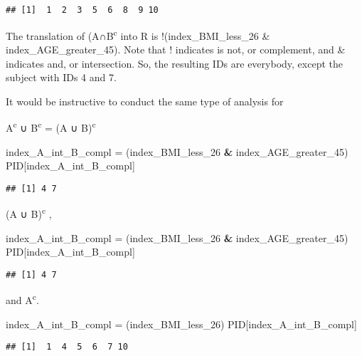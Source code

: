 \documentclass[]{article}
\newenvironment{Shaded}{\begin{snugshade}}{\end{snugshade}}
\newcommand{\DecValTok}[1]{\textcolor[rgb]{0.00,0.00,0.81}{#1}}
\newcommand{\NormalTok}[1]{#1}
\newcommand{\OperatorTok}[1]{\textcolor[rgb]{0.81,0.36,0.00}{\textbf{#1}}}
\newcommand{\StringTok}[1]{\textcolor[rgb]{0.31,0.60,0.02}{#1}}
\begin{document}
\begin{verbatim}
## [1]  1  2  3  5  6  8  9 10
\end{verbatim}

The translation of (A∩B\textsuperscript{c} into R is
!(index\_BMI\_less\_26 \& index\_AGE\_greater\_45). Note that !
indicates is not, or complement, and \& indicates and, or intersection.
So, the resulting IDs are everybody, except the subject with IDs 4 and
7.

It would be instructive to conduct the same type of analysis for

A\textsuperscript{c} ∪ B\textsuperscript{c} = (A ∪ B)\textsuperscript{c}

\begin{Shaded}
\begin{Highlighting}[]
\NormalTok{index_A_int_B_compl =}\StringTok{ }\NormalTok{(index_BMI_less_}\DecValTok{26} \OperatorTok{&}\StringTok{ }\NormalTok{index_AGE_greater_}\DecValTok{45}\NormalTok{) }
\NormalTok{PID[index_A_int_B_compl]}
\end{Highlighting}
\end{Shaded}

\begin{verbatim}
## [1] 4 7
\end{verbatim}

(A ∪ B)\textsuperscript{c} ,

\begin{Shaded}
\begin{Highlighting}[]
\NormalTok{index_A_int_B_compl =}\StringTok{ }\NormalTok{(index_BMI_less_}\DecValTok{26} \OperatorTok{&}\StringTok{ }\NormalTok{index_AGE_greater_}\DecValTok{45}\NormalTok{) }
\NormalTok{PID[index_A_int_B_compl]}
\end{Highlighting}
\end{Shaded}

\begin{verbatim}
## [1] 4 7
\end{verbatim}

and A\textsuperscript{c}.

\begin{Shaded}
\begin{Highlighting}[]
\NormalTok{index_A_int_B_compl =}\StringTok{ }\NormalTok{(index_BMI_less_}\DecValTok{26}\NormalTok{)}
\NormalTok{PID[index_A_int_B_compl]}
\end{Highlighting}
\end{Shaded}

\begin{verbatim}
## [1]  1  4  5  6  7 10
\end{verbatim}
\end{document}
